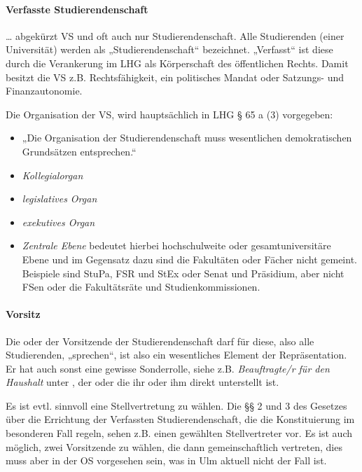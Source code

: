 \documentclass[
10pt,
a4paper,
twoside,								%
titlepage=false,							%
draft=false								%
]{scrartcl}
\begin{document}
\paragraph{Verfasste Studierendenschaft}

… abgekürzt VS und oft auch nur Studierendenschaft. Alle Studierenden (einer Universität) werden als „Studierendenschaft“ bezeichnet. „Verfasst“ ist diese durch die Verankerung im LHG als Körperschaft des öffentlichen Rechts. Damit besitzt die VS z.B. Rechtsfähigkeit, ein politisches Mandat oder Satzungs- und Finanzautonomie.


Die Organisation der VS, wird hauptsächlich in LHG § 65 a (3) vorgegeben:
\begin{itemize}
	\item „Die Organisation der Studierendenschaft muss wesentlichen demokratischen Grundsätzen entsprechen.“
	\item \emph{Kollegialorgan}
	\item \emph{legislatives Organ}
	\item \emph{exekutives Organ}
	\item \emph{Zentrale Ebene} bedeutet hierbei hochschulweite oder gesamtuniversitäre Ebene und im Gegensatz dazu sind die Fakultäten oder Fächer nicht gemeint. Beispiele sind StuPa, FSR und StEx oder Senat und Präsidium, aber nicht FSen oder die Fakultätsräte und Studienkommissionen.
\end{itemize}



\paragraph{Vorsitz}

Die oder der Vorsitzende der Studierendenschaft darf für diese, also alle Studierenden, „sprechen“, ist also ein wesentliches Element der Repräsentation. Er hat auch sonst eine gewisse Sonderrolle, siehe z.B. \emph{Beauftragte/r für den Haushalt} unter , der oder die ihr oder ihm direkt unterstellt ist.

Es ist evtl. sinnvoll eine Stellvertretung zu wählen. Die §§ 2 und 3 des Gesetzes über die Errichtung der Verfassten Studierendenschaft, die die Konstituierung im besonderen Fall regeln, sehen z.B. einen gewählten Stellvertreter vor. Es ist auch möglich, zwei Vorsitzende zu wählen, die dann gemeinschaftlich vertreten, dies muss aber in der OS vorgesehen sein, was in Ulm aktuell nicht der Fall ist.
\end{document}

